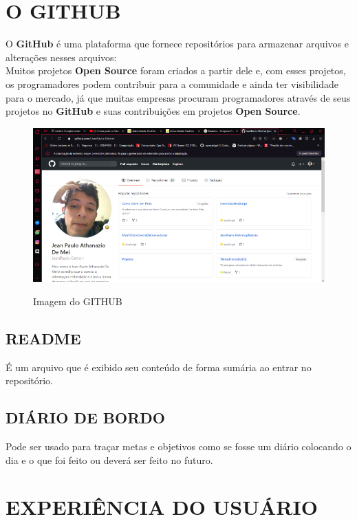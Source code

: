 \section{O GITHUB}
\label{OGitHub}

O \textbf{GitHub} é uma plataforma que fornece repositórios para armazenar arquivos e alterações nesses arquivos:\\ 
Muitos projetos \textbf{Open Source} foram criados a partir dele e, com esses projetos, os programadores podem contribuir para a comunidade e ainda ter visibilidade para o mercado, já que muitas empresas procuram programadores através de seus projetos no \textbf{GitHub} e suas contribuições em projetos \textbf{Open Source}. 

\begin{figure}[H]
	\centering
	\caption{Imagem do GITHUB}
	\includegraphics[scale=0.5]{./images/Figure_3}		
	\label{fig:Fig3}
\end{figure}

	\subsection{README}
	\label{subsec:README}
		É um arquivo que é exibido seu conteúdo de forma sumária ao entrar no repositório.
		
	\subsection{DIÁRIO DE BORDO}	
	\label{subsec:DIARIODEBORDO}
		Pode ser usado para traçar metas e objetivos como se fosse um diário colocando o dia e o que foi feito ou deverá ser feito no futuro. 
		
\section{EXPERIÊNCIA DO USUÁRIO}
\label{sec:EXPERIENCIADOUSUARIO}

